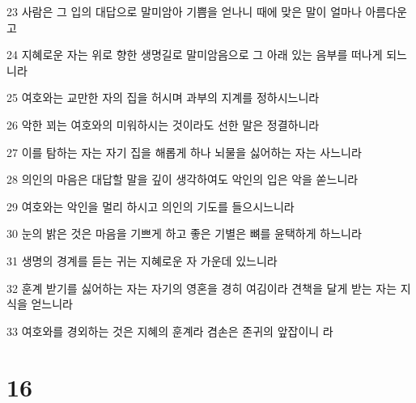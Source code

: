 \par 23 사람은 그 입의 대답으로 말미암아 기쁨을 얻나니 때에 맞은 말이 얼마나 아름다운고
\par 24 지혜로운 자는 위로 향한 생명길로 말미암음으로 그 아래 있는 음부를 떠나게 되느니라
\par 25 여호와는 교만한 자의 집을 허시며 과부의 지계를 정하시느니라
\par 26 악한 꾀는 여호와의 미워하시는 것이라도 선한 말은 정결하니라
\par 27 이를 탐하는 자는 자기 집을 해롭게 하나 뇌물을 싫어하는 자는 사느니라
\par 28 의인의 마음은 대답할 말을 깊이 생각하여도 악인의 입은 악을 쏟느니라
\par 29 여호와는 악인을 멀리 하시고 의인의 기도를 들으시느니라
\par 30 눈의 밝은 것은 마음을 기쁘게 하고 좋은 기별은 뼈를 윤택하게 하느니라
\par 31 생명의 경계를 듣는 귀는 지혜로운 자 가운데 있느니라
\par 32 훈계 받기를 싫어하는 자는 자기의 영혼을 경히 여김이라 견책을 달게 받는 자는 지식을 얻느니라
\par 33 여호와를 경외하는 것은 지혜의 훈계라 겸손은 존귀의 앞잡이니 라

\chapter{16}

